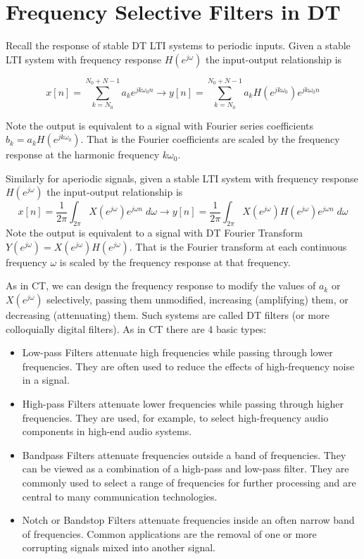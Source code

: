 \chapter{Frequency Selective Filters in DT}

Recall the response of stable DT LTI systems to periodic inputs. Given a stable LTI system with frequency response $H\left(e^{j\omega}\right)$ the input-output relationship is

\[
x[n] = \sum\limits_{k = N_0}^{N_0 + N-1} a_k e^{jk\omega_0n} \longrightarrow y[n] = \sum\limits_{k = N_0}^{N_0 + N-1} a_k H\left(e^{jk\omega_0}\right) e^{jk\omega_0n} 
\]

Note the output is equivalent to a signal with Fourier series coefficients $b_k = a_k H\left(e^{jk\omega_0}\right)$. That is the Fourier coefficients are scaled by the frequency response at the harmonic frequency $k\omega_0$.

Similarly for aperiodic signals, given a stable LTI system with frequency response $H\left(e^{j\omega}\right)$ the input-output relationship is
\[
x[n] = \frac{1}{2\pi} \int_{2\pi} X\left(e^{j\omega}\right) e^{j\omega n} \; d\omega \longrightarrow y[n] = \frac{1}{2\pi} \int_{2\pi} X\left(e^{j\omega}\right)H\left(e^{j\omega}\right) e^{j\omega n} \; d\omega
\]
Note the output is equivalent to a signal with DT Fourier Transform $Y\left(e^{j\omega}\right) = X\left(e^{j\omega}\right) H\left(e^{j\omega}\right)$. That is the Fourier transform at each continuous frequency $\omega$ is scaled by the frequency response at that frequency. 

As in CT, we can design the frequency response to modify the values of $a_k$ or $X\left(e^{j\omega}\right)$ selectively, passing them unmodified, increasing (amplifying) them, or decreasing (attenuating) them. Such systems are called DT filters (or more colloquially digital filters). As in CT there are 4 basic types:
\begin{itemize}
\item Low-pass Filters attenuate high frequencies while passing through lower frequencies. They are often used to reduce the effects of high-frequency noise in a signal.
\item High-pass Filters attenuate lower frequencies while passing through higher frequencies. They are used, for example, to select high-frequency audio components in high-end audio systems.
\item Bandpass Filters attenuate frequencies outside a band of frequencies. They can be viewed as a combination of a high-pass and low-pass filter. They are commonly used to select a range of frequencies for further processing and are central to many communication technologies. 
\item Notch or Bandstop Filters attenuate frequencies inside an often narrow band of frequencies. Common applications are the removal of one or more corrupting signals mixed into another signal.
\end{itemize}

